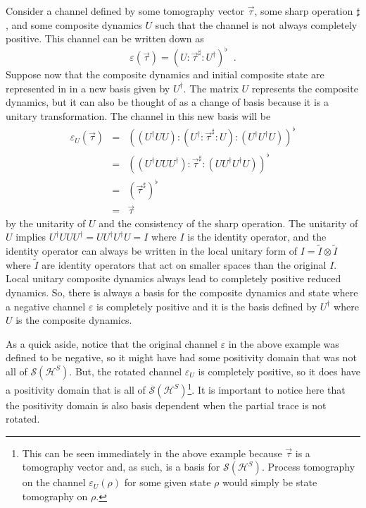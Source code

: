 Consider a channel defined by some tomography vector $\vec{\tau}$, some sharp operation $\sharp$, and some composite dynamics $U$ such that the channel is not always completely positive.  This channel can be written down as
$$
\varepsilon(\vec{\tau})=\left(U:\vec{\tau}^\sharp :U^\dagger\right)^\flat\;\;.
$$
Suppose now that the composite dynamics and initial composite state are represented in in a new basis given by $U^\dagger$.  The matrix $U$ represents the composite dynamics, but it can also be thought of as a change of basis because it is a unitary transformation.  The channel in this new basis will be
\begin{eqnarray*}
\varepsilon_U(\vec{\tau})&=&\left(\left(U^\dagger UU\right):\left(U^\dagger :\vec{\tau}^\sharp :U \right):\left(U^\dagger U^\dagger U \right)\right)^\flat\\
&=& \left(\left(U^\dagger UU U^\dagger\right):\vec{\tau}^\sharp :\left(UU^\dagger U^\dagger U \right)\right)^\flat\\
&=& \left(\vec{\tau}^\sharp \right)^\flat\\
&=& \vec{\tau}
\end{eqnarray*}
by the unitarity of $U$ and the consistency of the sharp operation.  The unitarity of $U$ implies $U^\dagger UU U^\dagger = UU^\dagger U^\dagger U = I$ where $I$ is the identity operator, and the identity operator can always be written in the local unitary form of $I=\tilde{I}\otimes\tilde{I}$ where $\tilde{I}$ are identity operators that act on smaller spaces than the original $I$.  Local unitary composite dynamics always lead to completely positive reduced dynamics.  So, there is always a basis for the composite dynamics and state where a negative channel $\varepsilon$ is completely positive and it is the basis defined by $U^\dagger$ where $U$ is the composite dynamics.  

As a quick aside, notice that the original channel $\varepsilon$ in the above example was defined to be negative, so it might have had some positivity domain that was not all of $\mathcal{S}(\mathcal{H}^S)$.  But, the rotated channel $\varepsilon_U$ is completely positive, so it does have a positivity domain that is all of $\mathcal{S}(\mathcal{H}^S)$\footnote{This can be seen immediately in the above example because $\vec{\tau}$ is a tomography vector and, as such, is a basis for $\mathcal{S}(\mathcal{H}^S)$.  Process tomography on the channel $\varepsilon_U(\rho)$ for some given state $\rho$ would simply be state tomography on $\rho$.}.  It is important to notice here that the positivity domain is also basis dependent when the partial trace is not rotated.

